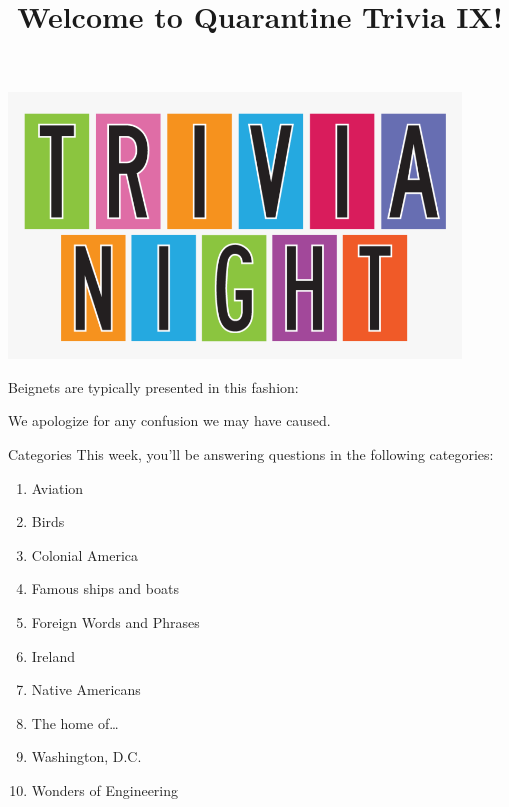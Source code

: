 \documentclass[11pt]{beamer}
\begin{document}
\title{Welcome to Quarantine Trivia IX!\vspace{-0.5in}}
\date{}

\begin{frame}
\titlepage{}
\begin{center}
\includegraphics[max width=0.9\textwidth,
    max height=0.4\textheight]{Images/triviatitleframelogo.png}
\end{center}
\end{frame}

\begingroup{}
\begin{frame}[t]{}

\medskip{}

Beignets are typically presented in this fashion:
\pause{}
\end{frame}
\begin{frame}[t]{}
\pause{}
We apologize for any confusion we may have caused.
\end{frame}
\endgroup{}

\begingroup{}
\begin{frame}[t]{Categories}
This week, you'll be answering questions in the following categories:
\begin{enumerate}
\item Aviation
\item Birds
\item Colonial America
\item Famous ships and boats
\item Foreign Words and Phrases
\item Ireland
\item Native Americans
\item The home of\ldots{}
\item Washington, D.C.
\item Wonders of Engineering
\end{enumerate}
\end{frame}
\endgroup{}
\end{document}
